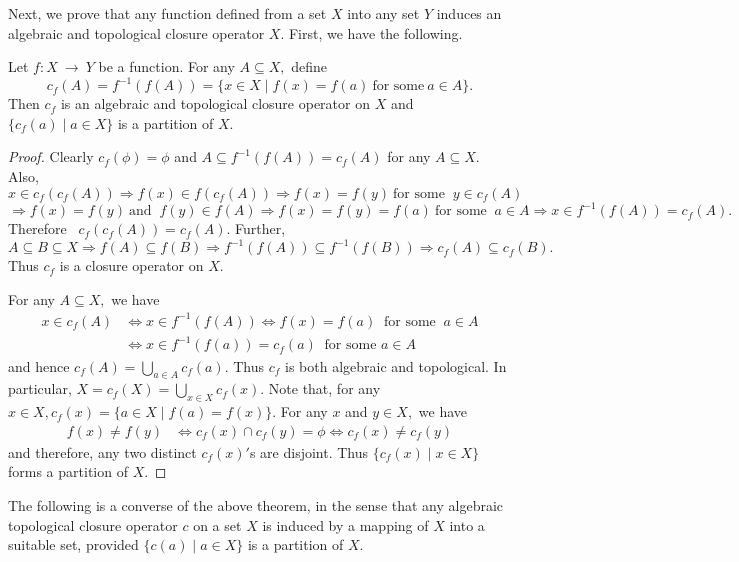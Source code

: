 \documentclass[
11pt,%
tightenlines,%
twoside,%
onecolumn,%
nofloats,%
nobibnotes,%
nofootinbib,%
superscriptaddress,%
noshowpacs,%
centertags]%
{revtex4}
\begin{document}
Next, we prove that any function defined from a set $X$  into any
set $Y$ induces an algebraic and topological closure operator $X.$
First, we have the following.

\begin{theorem}
\label{ch4sec4:thm6}
Let $f : X ~ \rightarrow ~Y$ be a function. For any $A \subseteq X,$ define
$$c_f (A) = f^{-1}(f(A)) = \{ x \in X \mid f(x) = f(a) ~\text{for some}~ a \in A \}.$$
Then $c_f$ is an algebraic and topological closure operator  on $X$
and $\{ c_f (a) \mid  a \in X \}$ is a partition of $X$.
\end{theorem}
\begin{proof}
Clearly $c_f (\phi) = \phi$ and $A \subseteq f^{-1}(f(A)) = c_f (A)$ for any $A \subseteq X.$ Also,
$$
x \in c_f(c_f (A))  \Longrightarrow f(x) \in f(c_f (A))
 \Longrightarrow f(x) = f(y) ~\text{for some }~ y \in c_f(A)
$$
$$
\Longrightarrow f(x) = f(y) ~\text{and }~ f(y) \in f(A)
\Longrightarrow f(x) = f(y) = f(a) ~\text{for some }~ a \in A  \Longrightarrow x \in f^{-1}(f(A)) = c_f (A).
$$
Therefore~ $c_f (c_f(A))  = c_f (A).$ Further,
$$
A \subseteq B \subseteq X  \Longrightarrow f(A) \subseteq f(B)
 \Longrightarrow f^{-1}(f(A)) \subseteq f^{-1}(f(B))  \Longrightarrow c_f (A) \subseteq c_f (B).
$$
Thus $c_f$ is a closure operator on $X.$

For any $A \subseteq X,$ we have
\begin{align*}
x \in c_f (A) & \Longleftrightarrow x \in f^{-1} ( f( A))
 \Longleftrightarrow f(x) = f(a) ~\text{ for some }~ a \in A \\
& \Longleftrightarrow x \in f^{-1}(f (a)) = c_f(a) ~\text{ for some } a \in A
\end{align*}
and hence $c_f (A)  = \bigcup_{a \in A} c_f (a).$ Thus $c_f$ is both
algebraic and topological. In particular, $X = c_f (X) = \bigcup _{
x \in X} c_f (x).$ Note that, for any $x \in X, c_f(x) = \{a \in X
\mid f(a) = f(x) \}.$ For any $x$ and $y \in X,$ we have
\begin{align*}
f(x) \neq f(y) & \Longleftrightarrow c_f (x) \cap c_f (y) = \phi
 \Longleftrightarrow  c_f (x) \neq c_f (y)
\end{align*}
and therefore, any two distinct $c_f(x)' $s are disjoint.  Thus $\{
c_f(x) \mid x \in X \}$ forms a partition of $X.$
\end{proof}

The following is a converse of the above theorem, in the sense  that
any algebraic topological closure operator $c$ on a set $X$ is
induced by a mapping of $X$ into a suitable set, provided $\{c(a)
\mid a \in X \}$ is a partition of $X.$
\end{document}
